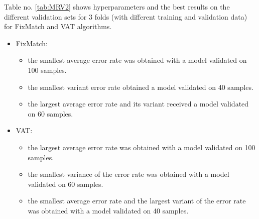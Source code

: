 \documentclass[12pt]{article}
\theoremstyle{definition}
\DeclareRobustCommand{\[}{\begin{equation}}
\DeclareRobustCommand{\]}{\end{equation}}
\begin{document}
\par Table no. \ref{tab:MRV2} shows hyperparameters and the best results on the different validation sets for 3 folds (with different training and validation data) for FixMatch and VAT algorithms.
\begin{itemize}
    \item FixMatch:
    \begin{itemize}
        \item the smallest average error rate was obtained with a model validated on 100 samples.
        \item the smallest variant error rate obtained a model validated on 40 samples.
        \item the largest average error rate and its variant received a model validated on 60 samples.
    \end{itemize}
    \item VAT:
    \begin{itemize}
        \item the largest average error rate was obtained with a model validated on 100 samples.
        \item the smallest variance of the error rate was obtained with a model validated on 60 samples.
        \item the smallest average error rate and the largest variant of the error rate was obtained with a model validated on 40 samples.
    \end{itemize}
\end{itemize}
\vspace{5mm} %
\vspace{5mm} %
\end{document}
